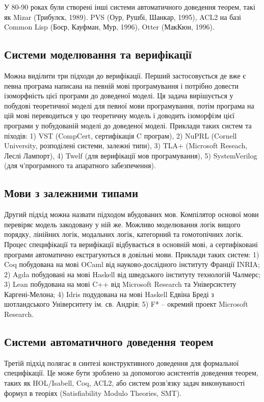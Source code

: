 \documentclass{article}
\begin{document}
У 80-90 роках були створені інші системи автоматичного доведення теорем,
такі як Mizar (Трибулєк, 1989). PVS (Оур, Рушбі, Шанкар, 1995),
ACL2 на базі Common Lisp (Боєр, Кауфман, Мур, 1996), Otter (МакКюн, 1996).

\subsection{Системи моделювання та верифікації}
Можна виділити три підходи до верифікації.
Перший застосовується де вже є
певна програма написана на певній мові програмування і потрібно довести ізоморфність
цієї програми до доведеної моделі. Ця задача вирішується у побудові теоретичної моделі
для певної мови програмування, потім програма на цій мові переводиться у цю
теоретичну модель і доводить ізоморфізм цієї програми у побудованій моделі до доведеної моделі.
Приклади таких систем та піходів: 1) VST (CompCert, сертифікація C програм),
2) NuPRL (Cornell University, розподілені системи, залежні типи),
3) TLA+ (Microsoft Reseach, Леслі Лампорт),
4) Twelf (для верифікації мов програмування), 5) SystemVerilog (для
ч'програмного та апаратного забезпечення).

\subsection{Мови з залежними типами}
Другий підхід можна назвати підходом вбудованих мов.
Компілятор основої мови перевіряє модель закодовану у ній же. Можливо моделювання
логік вищого порядку, лінійних логік, модальних логік, категорний та гомотопічних логік.
Процес специфікації та верифікації відбувається в основній мові, а сертифіковані програми
автоматично екстрагуються в довільні мови.
Приклади таких систем: 1) Coq побудована на мові OCaml від науково-дослідного
інституту Франції INRIA; 2) Agda побудовані на мові Haskell від шведського інституту технологій Чалмерс;
3) Lean побудована на мові C++ від Microsoft Research та Універсистету Каргені-Мелона;
4) Idris подудована на мові Haskell Едвіна Бреді з шотландського Університету ім. св. Андрія;
5) F* -- окремий проект Microsoft Research.

\subsection{Системи автоматичного доведення теорем}
Третій підхід полягає в синтезі конструктивного доведення
для формальної специфікації. Це може бути зроблено за
допомогою асистентів доведення теорем, таких як HOL/Isabell, Coq, ACL2,
або систем розв'язку задач виконуваності формул в теоріях (Satisfiability Modulo Theories, SMT).
\end{document}
